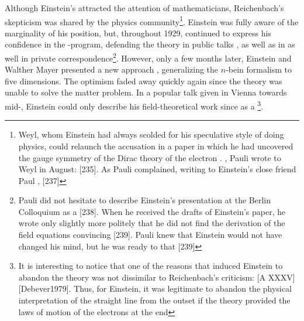 \documentclass[draft]{article}
\newcommand{\nbein}{$n$-bein\xspace}
\newcommand{\FP}{\german{Fernparallelismus}\xspace}
\begin{document}
Although Einstein's \FP attracted the attention of mathematicians, Reichenbach's skepticism was shared by the physics community\footnote{Weyl, whom Einstein had always scolded for his speculative style of doing physics, could relaunch the accusation in a paper \citep{Weyl1929c} in which he had uncovered the gauge symmetry of the Dirac theory of the electron . , Pauli wrote to Weyl in August:  [235]. As Pauli complained, writing to Einstein's close friend Paul \Ehr,  [237]}. Einstein was fully aware of the marginality of his position, but, throughout 1929, continued to express his confidence in the \FP-program, defending the theory in public talks \citep{Einstein1930,Einstein1930a,Einstein1930b}, as well as in as well in private correspondence\footnote{Pauli did not hesitate to describe Einstein's presentation at the Berlin Colloquium as a  [238]. When he received the drafts of Einstein's  paper, he wrote only slightly more politely that he did not find the derivation of the field equations convincing [239]. Pauli knew that Einstein would not have changed his mind, but he was ready to  that  [239]}. However, only a few months later, Einstein and Walther Mayer presented a new approach \citep{Einstein1931}, generalizing the \nbein formalism to five dimensions. The optimism faded away quickly again since the theory was unable to solve the matter problem. In a popular talk given in Vienna towards mid-, Einstein could only describe his field-theoretical work since \gr as a  \citep[441]{Einstein1932b}\footnote{It is interesting to notice that one of the reasons that induced Einstein to abandon the theory was not dissimilar to Reichenbach's criticism:  [A XXXV][Debever1979]. Thus, for Einstein, it was legitimate to abandon the physical interpretation of the straight line from the outset if the theory provided the laws of motion of the electrons at the end}.
\end{document}
